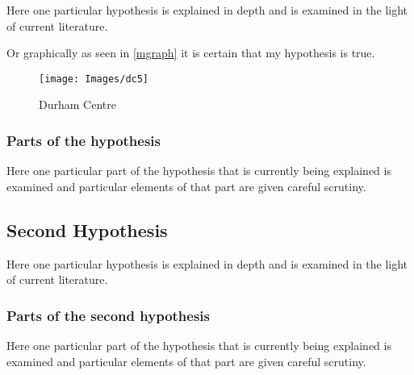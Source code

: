 Here one particular hypothesis is explained in depth
and is examined in the light of current literature.

Or graphically as seen in \autoref{mgraph}
it is certain that my hypothesis is true.

\begin{figure}[h!tb] \centering

  \texttt{[image: Images/dc5]}

  \caption{Durham Centre}
  \label{mgraph}
\end{figure}

\subsubsection{Parts of the hypothesis}

Here one particular part of the hypothesis that is
currently being explained is examined and particular
elements of that part are given careful scrutiny.


\subsection{Second Hypothesis}

Here one particular hypothesis is explained in depth
and is examined in the light of current literature.

\subsubsection{Parts of the second hypothesis}

Here one particular part of the hypothesis that is
currently being explained is examined and particular
elements of that part are given careful scrutiny.

